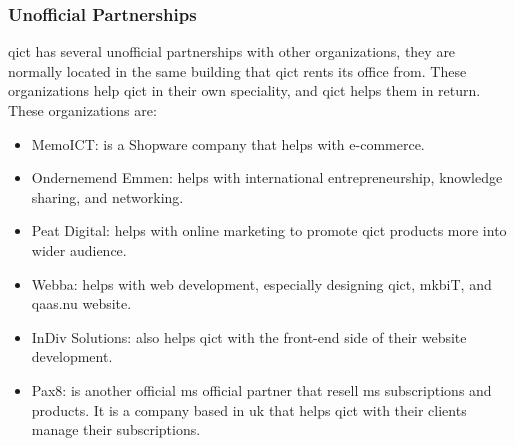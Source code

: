 

\subsubsection{Unofficial Partnerships}

\acrshort{qict} has several unofficial partnerships with other organizations, they are normally located in the same building that
\acrshort{qict} rents its office from. These organizations help \acrshort{qict} in their own speciality, and \acrshort{qict} helps them
in return. These organizations are:

\begin{itemize}
      \item MemoICT: is a Shopware company that helps with e-commerce.
      \item Ondernemend Emmen: helps with international entrepreneurship, knowledge sharing, and networking.
      \item Peat Digital: helps with online marketing to promote \acrshort{qict} products more into wider audience.
      \item Webba: helps with web development, especially designing \acrshort{qict}, \acrshort{mkb}iT, and \acrshort{qaas}.nu website.
      \item InDiv Solutions: also helps \acrshort{qict} with the front-end side of their website development.
      \item Pax8: is another official \acrshort{ms} official partner that resell \acrshort{ms} subscriptions and products. It is a
            company based in \acrshort{uk} that helps \acrshort{qict} with their clients manage their subscriptions.
\end{itemize}

